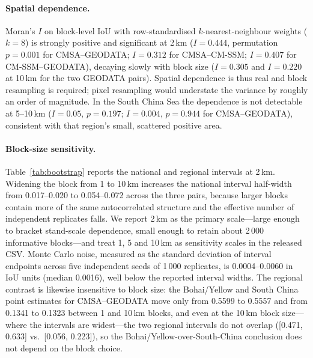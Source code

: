 \documentclass[11pt]{article}
\begin{document}
\paragraph{Spatial dependence.}
Moran's $I$ on block-level IoU with row-standardised $k$-nearest-neighbour
weights ($k=8$) is strongly positive and significant at 2\,km
($I=0.444$, permutation $p=0.001$ for CMSA--GEODATA; $I=0.312$ for
CMSA--CM-SSM; $I=0.407$ for CM-SSM--GEODATA), decaying slowly with block size
($I=0.305$ and $I=0.220$ at 10\,km for the two GEODATA pairs). Spatial
dependence is thus real and block resampling is required; pixel resampling
would understate the variance by roughly an order of magnitude. In the
South China Sea the dependence is not detectable at 5--10\,km
($I=0.05$, $p=0.197$; $I=0.004$, $p=0.944$ for CMSA--GEODATA), consistent
with that region's small, scattered positive area.

\paragraph{Block-size sensitivity.}
Table~\ref{tab:bootstrap} reports the national and regional intervals at
2\,km. Widening the block from 1 to 10\,km increases the national interval
half-width from 0.017--0.020 to 0.054--0.072 across the three pairs, because
larger blocks contain more of the same autocorrelated structure and the
effective number of independent replicates falls. We report 2\,km as the
primary scale---large enough to bracket stand-scale dependence, small enough
to retain about 2\,000 informative blocks---and treat 1, 5 and 10\,km as
sensitivity scales in the released CSV. Monte Carlo noise, measured as the
standard deviation of interval endpoints across five independent seeds of
1\,000 replicates, is 0.0004--0.0060 in IoU units (median 0.0016), well below
the reported interval widths. The regional contrast is likewise insensitive
to block size: the Bohai/Yellow and South China point estimates for
CMSA--GEODATA move only from 0.5599 to 0.5557 and from 0.1341 to 0.1323
between 1 and 10\,km blocks, and even at the 10\,km block size---where the
intervals are widest---the two regional intervals do not overlap
([0.471, 0.633] vs.\ [0.056, 0.223]), so the Bohai/Yellow-over-South-China
conclusion does not depend on the block choice.
\end{document}
